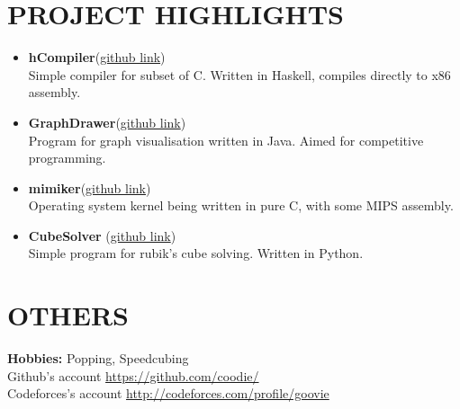 \documentclass[line,overlapped]{res}
\begin{document}
\begin{resume}
\section{PROJECT HIGHLIGHTS}
\begin{itemize}
\item
{
	\textbf{hCompiler}(\href{https://github.com/coodie/hCompiler}{github link}) \\
	Simple compiler for subset of C. Written in Haskell, compiles directly to x86 assembly.
}
\item
{
	\textbf{GraphDrawer}(\href{https://github.com/coodie/GraphDrawer}{github link}) \\
	Program for graph visualisation written in Java. Aimed for competitive programming.
}
\item
{
	\textbf{mimiker}(\href{https://github.com/cahirwpz/mimiker}{github link}) \\
	Operating system kernel being written in pure C, with some MIPS assembly.
}
\item
{
	\textbf{CubeSolver} (\href{https://github.com/coodie/CubeSolver}{github link}) \\
	Simple program for rubik's cube solving. Written in Python.
}
\end{itemize}

\section{OTHERS}
\textbf{Hobbies:} Popping, Speedcubing \\
Github's account \url{https://github.com/coodie/}\\
Codeforces's account \url{http://codeforces.com/profile/goovie}

\vfill

\end{resume}
\end{document}
